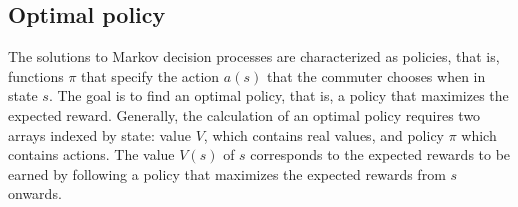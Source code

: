 \documentclass[dissertation,draft*]{aaltoseries}
\begin{document}
 
% 
% 

\subsection{Optimal policy}
\label{solution}
The solutions to Markov decision processes are characterized as policies, 
that is, functions $\pi$ that specify the action 
$a(s) $ that the commuter chooses when in state $s$. 
The goal is to find an optimal policy, that is, a policy that maximizes the expected reward. 
Generally, the calculation of an optimal policy requires two arrays indexed by state: 
value $V$, which contains real values, and policy $\pi$ which contains actions. 
The value $V(s)$ of $s$ corresponds to the expected rewards to be earned by following a 
policy that maximizes the expected rewards from $s$ onwards.
\end{document}
